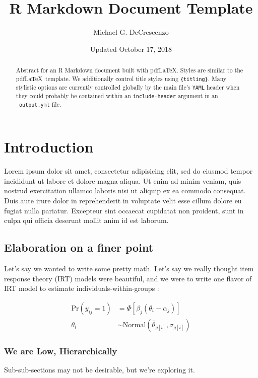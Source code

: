 \documentclass[12pt,]{article}
\title{R Markdown Document Template}
\author{Michael G. DeCrescenzo}
\date{Updated October 17, 2018}
\begin{document}
\maketitle
\begin{abstract}
Abstract for an R Markdown document built with pdf\LaTeX. Styles are
similar to the pdf\LaTeX~template. We additionally control title styles
using \texttt{\{titling\}}. Many stylistic options are currently
controlled globally by the main file's \texttt{YAML} header when they
could probably be contained within an \texttt{include-header} argument
in an \texttt{\_output.yml} file.
\end{abstract}

\hypertarget{introduction}{%
\section{Introduction}\label{introduction}}

Lorem ipsum dolor sit amet, consectetur adipisicing elit, sed do eiusmod
tempor incididunt ut labore et dolore magna aliqua. Ut enim ad minim
veniam, quis nostrud exercitation ullamco laboris nisi ut aliquip ex ea
commodo consequat. Duis aute irure dolor in reprehenderit in voluptate
velit esse cillum dolore eu fugiat nulla pariatur. Excepteur sint
occaecat cupidatat non proident, sunt in culpa qui officia deserunt
mollit anim id est laborum.

\hypertarget{elaboration-on-a-finer-point}{%
\subsection{Elaboration on a finer
point}\label{elaboration-on-a-finer-point}}

Let's say we wanted to write some pretty math. Let's say we really
thought item response theory (IRT) models were beautiful, and we were to
write one flavor of IRT model to estimate individuals-within-groups
\citep{caughey2015dynamic}:

\begin{align}
  \mathrm{Pr}\left( y_{ij} = 1 \right)
  &=
  \Phi \left[
    \beta_{j} \left( \theta_{i} - \alpha_{j} \right)
  \right] \\
  \theta_{i} &\sim \mathrm{Normal}\left(\bar{\theta}_{g[i]}, \sigma_{g[i]} \right)
\end{align}

\hypertarget{we-are-low-hierarchically}{%
\subsubsection{We are Low,
Hierarchically}\label{we-are-low-hierarchically}}

Sub-sub-sections may not be desirable, but we're exploring it.

\renewcommand\refname{References}

\end{document}
